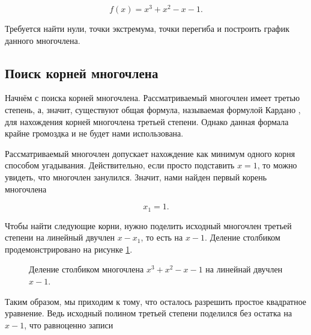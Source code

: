 \documentclass[12pt]{article}
\begin{document}
\begin{equation}
	f(x) = x^3 + x^2 -x -1.
\end{equation}

Требуется найти нули, точки экстремума, точки перегиба и построить график данного многочлена.

\subsection{Поиск корней многочлена} %
Начнём с поиска корней многочлена. Рассматриваемый многочлен имеет третью степень, а, значит, существуют общая формула, называемая формулой Кардано \cite{root3}, для нахождения корней многочлена третьей степени. Однако данная формала крайне громоздка и не будет нами использована.

\par Рассматриваемый многочлен допускает нахождение как минимум одного корня способом угадывания. Действительно, если просто подставить $x=1$, то можно увидеть, что многочлен занулился. Значит, нами найден первый корень многочлена

\begin{equation}
 	x_1 = 1.
 \end{equation} 

Чтобы найти следующие корни, нужно поделить исходный многочлен третьей степени на линейный двучлен $x-x_1$, то есть на $x-1$. Деление столбиком продемонстрировано на рисунке \ref{fig:72}.

\begin{figure}[htbp]
	\centering
	\caption{Деление столбиком многочлена $x^3+x^2-x-1$ на линейнай двучлен $x-1$.}
	\label{fig:72}
\end{figure}

Таким образом, мы приходим к тому, что осталось разрешить простое квадратное уравнение. Ведь исходный полином третьей степени поделился без остатка на $x-1$, что равноценно записи
\end{document}

